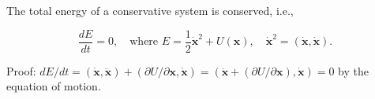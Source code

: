 The total energy of a conservative system is conserved, i.e.,

$$\frac{dE}{dt} = 0, \quad \text{where } E = \frac{1}{2} \dot{\mathbf{x}}^2 + U(\mathbf{x}), \quad \dot{\mathbf{x}}^2 = (\dot{\mathbf{x}}, \dot{\mathbf{x}}).$$

Proof: $dE/dt = (\dot{\mathbf{x}}, \ddot{\mathbf{x}}) + (\partial U / \partial \mathbf{x}, \dot{\mathbf{x}}) = (\ddot{\mathbf{x}} + (\partial U / \partial \mathbf{x}), \dot{\mathbf{x}}) = 0$ by the equation of motion.
